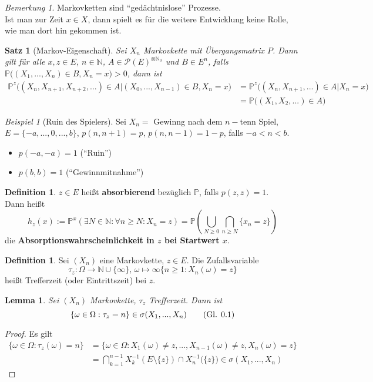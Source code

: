 \documentclass[10pt,a4paper]{article}
\newcommand{\N}{\ensuremath{\mathbb{N}}}
\newcommand{\potset}{\mathscr P}
\newcommand{\Prb}{\mathbb P}
\theoremstyle{plain}
\newtheorem{lem}[theorem]{Lemma}
\newtheorem{satz}[theorem]{Satz}
\theoremstyle{definition}
\newtheorem{definition}[theorem]{Definition}
\theoremstyle{remark}
\newtheorem*{bem*}{Bemerkung}
\newtheorem{exm}[theorem]{Beispiel}
\newcommand{\autotag}{\stepcounter{equation}\tag{Gl. \arabic{section}.\arabic{equation}}}
\begin{document}
	\begin{bem*}
		Markovketten sind \enquote{gedächtnislose} Prozesse.\\
		Ist man zur Zeit $x\in X$, dann spielt es für die weitere Entwicklung keine Rolle, wie man dort hin gekommen ist.
	\end{bem*}

	\begin{satz}[Markov-Eigenschaft]\label{0708satzMarkov}
		Sei $X_n$ Markovkette mit Übergangsmatrix $P$. Dann gilt für alle $x,z\in E$, $n\in\N$, $A\in\potset(E)^{\otimes\N_0}$ und $B\in E^n$, falls $\Prb\big((X_1,...,X_n)\in B,X_n=x\big)>0$, dann ist
		\begin{align*}
		\Prb^z\big((X_n,X_{n+1},X_{n+2},...)\in A\vert (X_0,...,X_{n-1})\in B,X_n=x\big)&=\Prb^z\big((X_n,X_{n+1},...)\in A\vert X_n=x\big)\\
		&=\Prb\big((X_1,X_2,...)\in A\big)
		\end{align*}
	\end{satz}

	\begin{exm}[Ruin des Spielers]
		Sei $X_n=$ Gewinng nach dem $n-$tenn Spiel, $E=\{-a,...,0,...,b\}$, $p(n,n+1)=p$, $p(n,n-1)=1-p$, falls $-a<n<b$.
		\begin{itemize}
		\item $p(-a,-a)=1$ (\enquote{Ruin})
		\item $p(b,b)=1$ (\enquote{Gewinnmitnahme})
		\end{itemize}
	\end{exm}

	\begin{definition}\label{0710def}
		$z\in E$ heißt \textbf{absorbierend} bezüglich $\Prb$, falls $p(z,z)=1$.\\
		Dann heißt
		\[h_z(x):=\Prb^x\left(\exists N\in\N:\forall n\geq N:X_n=z\right)=\Prb\left(\bigcup_{N\geq 0}\bigcap_{n\geq N}\{x_n=z\}\right)\]
		die \textbf{Absorptionswahrscheinlichkeit in $z$ bei Startwert $x$}.
	\end{definition}
	
	\begin{definition}\label{0711def}
		Sei $(X_n)$ eine Markovkette, $z\in E$. Die Zufallsvariable
		\[\tau_z:\Omega\to\N\cup\{\infty\},\,\omega\mapsto\infty\{n\geq 1:X_n(\omega)=z\}\]
		heißt Trefferzeit (oder Eintrittszeit) bei $z$.
	\end{definition}
	
	\begin{lem}\label{0712lem}
		Sei $(X_n)$ Markovkette, $\tau_z$ Trefferzeit. Dann ist
		\[\{\omega\in\Omega:\tau_z=n\}\in\sigma(X_1,...,X_n)\autotag\label{eq:0702}\]
	\end{lem}
	\begin{proof}
		Es gilt\begin{align*}
		\{\omega\in\Omega:\tau_z(\omega)=n\}&=\{\omega\in\Omega:X_1(\omega)\neq z,...,X_{n-1}(\omega)\neq z,X_n(\omega)=z\}\\
		&=\bigcap_{k=1}^{n-1}X_k^{-1}\left(E\setminus\{z\}\right)\cap X_n^{-1}\big(\{z\}\big)\in\sigma(X_1,...,X_n)
		\end{align*}
	\end{proof}
\end{document}
